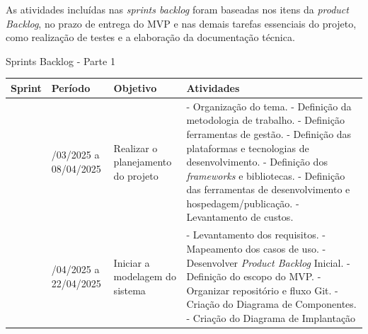 \documentclass[
	12pt,				%
	openany,			%
	oneside,			%
	a4paper,			%
	english,			%
	french,				%
	spanish,			%
	brazil				%
	]{abntex2}
\begin{document}
As atividades incluídas nas \textit{sprints backlog} foram baseadas nos itens da \textit{product Backlog}, no prazo de entrega do MVP e nas demais tarefas essenciais do projeto, como realização de testes e a elaboração da documentação técnica. 
\\
\begin{quadro}[H]
	\caption{Sprints Backlog - Parte 1} 
	\label{sprints_backlog_1} 
\begin{tabular}{|>{\centering\arraybackslash}m{1.2cm}|>{\centering\arraybackslash}m{3cm}|>{\centering\arraybackslash}m{4.5cm}|>{\raggedright\arraybackslash}m{5.5cm}|}
		\hline
		\textbf{Sprint} & \textbf{Período} & \textbf{Objetivo} & \textbf{Atividades} \\
		\hline 
		1 & 25/03/2025 a 08/04/2025 & Realizar o planejamento do projeto  & 
		- Organização do tema. \newline - Definição da metodologia de trabalho. \newline - Definição ferramentas de gestão. \newline
		- Definição das plataformas e tecnologias de desenvolvimento. \newline  - Definição dos \textit{frameworks} e bibliotecas. \newline - Definição das ferramentas de desenvolvimento e hospedagem/publicação. \newline - Levantamento de custos. \\
		\hline
		2 & 09/04/2025 a 22/04/2025 & Iniciar a modelagem do sistema  &
		- Levantamento dos requisitos. \newline - Mapeamento dos casos de uso. \newline - Desenvolver \textit{Product Backlog} Inicial. \newline
		- Definição do escopo do MVP. \newline - Organizar repositório e fluxo Git. \newline - Criação do Diagrama de Componentes. \newline - Criação do Diagrama de Implantação \\	\hline
	\end{tabular}
\end{quadro}
\end{document}
